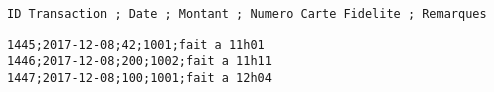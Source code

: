 \documentclass[11pt,a4paper]{article}
\begin{document}
\bigskip

\lstset{language=sh}
\begin{lstlisting}[frame=single,title={Format des fichiers de transactions}]
ID Transaction ; Date ; Montant ; Numero Carte Fidelite ; Remarques
\end{lstlisting}

\lstset{language=sh}
\begin{lstlisting}[frame=single,title={transaction-2017-12-08}]
1445;2017-12-08;42;1001;fait a 11h01
1446;2017-12-08;200;1002;fait a 11h11
1447;2017-12-08;100;1001;fait a 12h04
\end{lstlisting}
\end{document}

